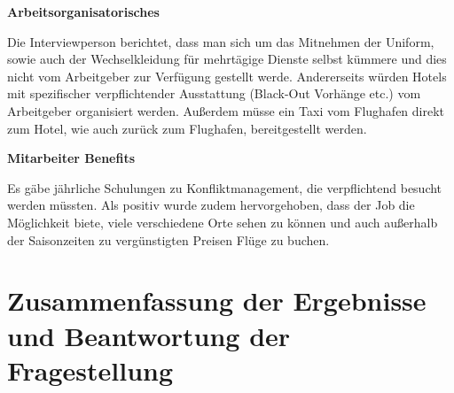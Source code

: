 \documentclass[12pt, a4paper]{article}
\begin{document}
\textbf{Arbeitsorganisatorisches}

Die Interviewperson berichtet, dass man sich um das Mitnehmen der Uniform, sowie auch der Wechselkleidung für mehrtägige
Dienste selbst kümmere und dies nicht vom Arbeitgeber zur Verfügung gestellt werde.
Andererseits würden Hotels mit spezifischer verpflichtender Ausstattung (Black-Out Vorhänge etc.) vom Arbeitgeber organisiert werden.
Außerdem müsse ein Taxi vom Flughafen direkt zum Hotel, wie auch zurück zum Flughafen, bereitgestellt werden.

\textbf{Mitarbeiter Benefits}

Es gäbe jährliche Schulungen zu Konfliktmanagement, die verpflichtend besucht werden müssten.
Als positiv wurde zudem hervorgehoben, dass der Job die Möglichkeit biete, viele verschiedene Orte sehen zu können und
auch außerhalb der Saisonzeiten zu vergünstigten Preisen Flüge zu buchen.

\section{Zusammenfassung der Ergebnisse und Beantwortung der Fragestellung}
\end{document}
